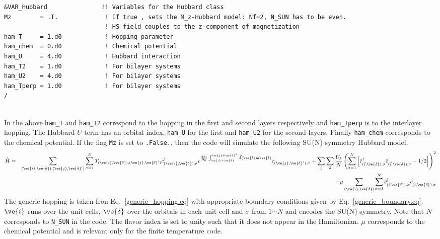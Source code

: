 \begin{lstlisting}[style=fortran,escapechar=\#,breaklines=true]
&VAR_Hubbard               !! Variables for the Hubbard class
Mz        = .T.             ! If true , sets the M_z-Hubbard model: Nf=2, N_SUN has to be even.  
                            ! HS field couples to the z-component of magnetization
ham_T     = 1.d0            ! Hopping parameter
ham_chem  = 0.d0            ! Chemical potential
ham_U     = 4.d0            ! Hubbard interaction
ham_T2    = 1.d0            ! For bilayer systems
ham_U2    = 4.d0            ! For bilayer systems
ham_Tperp = 1.d0            ! For bilayer systems
/
               
\end{lstlisting}
In the above   \texttt{ham\_T} and \texttt{ham\_T2}   correspond to the hopping in the first and second layers respectively and  \texttt{ham\_Tperp}   is to the interlayer hopping.   The Hubbard $U$ term has an orbital index, 
 \texttt{ham\_U}  for the first and  \texttt{ham\_U2}   for the second layers.  Finally   \texttt{ham\_chem}  corresponds to the chemical potential.     If  the flag \texttt{Mz} is set to \texttt{.False.},   then the code will simulate the  following 
SU(N)   symmetry Hubbard model. 
\begin{eqnarray}
\hat{H}= & & \sum_{(\ve{i},\ve{\delta}), (\ve{j},\ve{\delta}')}  \sum_{\sigma =1}^{N}  T_{(\ve{i},\ve{\delta}), (\ve{j},\ve{\delta}')}    c^{\dagger}_{(\ve{i},\ve{\delta}), \sigma }   e^{\frac{2 \pi i}{\Phi_0} \int_{\ve{i} + \ve{\delta}}^{\ve{j} + \ve{\delta}'}  
     \vec{A}(\ve{l})  d \ve{l}} c^{}_{(\ve{j},\ve{\delta}'),\sigma} 
+ \sum_{\vec{i}} \sum_{\delta}   \frac{U_\delta}{N} \left(\sum_{\sigma=1}^{N}  \left[   \hat{c}^{\dagger}_{(\vec{i},\ve{\delta}),\sigma } 
    \hat{c}^{\phantom\dagger}_{(\vec{i}, \ve{\delta}),\sigma }  - 1/2  \right] \right)^2  \nonumber \\
    & & - \mu \sum_{(\ve{i},\ve{\delta})}  \sum_{\sigma =1}^{N} \hat{c}^{\dagger}_{(\vec{i},\ve{\delta}),\sigma } \hat{c}^{\phantom\dagger}_{(\vec{i},\ve{\delta}),\sigma } 
\end{eqnarray}
The  generic hopping is taken fron Eq.~\ref{generic_hopping.eq}   with appropriate boundary conditions given by Eq.~\ref{generic_boundary.eq}.    $\ve{i}$ runs over the unit cells, $\ve{\delta}$ over the orbitals in each unit cell and $\sigma$  from $1 \cdots N$  and encodes  the SU(N) symmetry.    Note that  $N$ corresponds to \texttt{N\_SUN}  in the code.  The flavor index is set to  unity such that it does not appear in the  Hamiltonian.  $\mu$ corresponds to the chemical potential  and is relevant only for the finite temperature code. 

